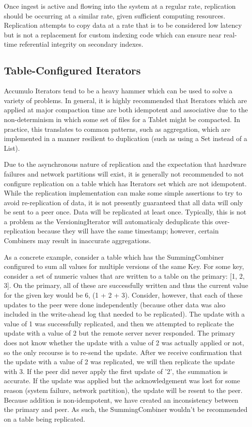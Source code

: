 Once ingest is active and flowing into the system at a regular rate, replication should be occurring at a similar rate, 
given sufficient computing resources. Replication attempts to copy data at a rate that is to be considered low latency
but is not a replacement for custom indexing code which can ensure near real-time referential integrity on secondary indexes.

\subsection{Table-Configured Iterators}

Accumulo Iterators tend to be a heavy hammer which can be used to solve a variety of problems. In general, it is highly
recommended that Iterators which are applied at major compaction time are both idempotent and associative due to the
non-determinism in which some set of files for a Tablet might be compacted. In practice, this translates to common patterns,
such as aggregation, which are implemented in a manner resilient to duplication (such as using a Set instead of a List).

Due to the asynchronous nature of replication and the expectation that hardware failures and network partitions will exist,
it is generally not recommended to not configure replication on a table which has Iterators set which are not idempotent.
While the replication implementation can make some simple assertions to try to avoid re-replication of data, it is not
presently guaranteed that all data will only be sent to a peer once. Data will be replicated at least once. Typically,
this is not a problem as the VersioningIterator will automaticaly deduplicate this over-replication because they will
have the same timestamp; however, certain Combiners may result in inaccurate aggregations.

As a concrete example, consider a table which has the SummingCombiner configured to sum all values for
multiple versions of the same Key. For some key, consider a set of numeric values that are written to a table on the
primary: [1, 2, 3]. On the primary, all of these are successfully written and thus the current value for the given key
would be 6, (1 + 2 + 3). Consider, however, that each of these updates to the peer were done independently (because
other data was also included in the write-ahead log that needed to be replicated). The update with a value of 1 was
successfully replicated, and then we attempted to replicate the update with a value of 2 but the remote server never
responded. The primary does not know whether the update with a value of 2 was actually applied or not, so the
only recourse is to re-send the update. After we receive confirmation that the update with a value of 2 was replicated,
we will then replicate the update with 3. If the peer did never apply the first update of '2', the summation is accurate.
If the update was applied but the acknowledgement was lost for some reason (system failure, network partition), the
update will be resent to the peer. Because addition is non-idempotent, we have created an inconsistency between the
primary and peer. As such, the SummingCombiner wouldn't be recommended on a table being replicated.

